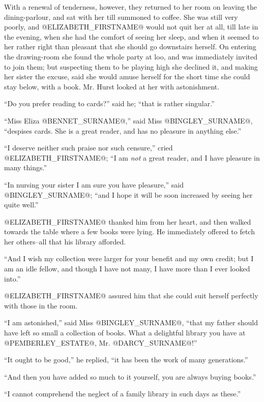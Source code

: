 With a renewal of tenderness, however, they returned to her room on
leaving the dining-parlour, and sat with her till summoned to coffee.
She was still very poorly, and @ELIZABETH_FIRSTNAME@ would not quit her at all, till
late in the evening, when she had the comfort of seeing her sleep, and
when it seemed to her rather right than pleasant that she should go
downstairs herself. On entering the drawing-room she found the whole
party at loo, and was immediately invited to join them; but suspecting
them to be playing high she declined it, and making her sister the
excuse, said she would amuse herself for the short time she could stay
below, with a book. Mr. Hurst looked at her with astonishment.

``Do you prefer reading to cards?'' said he; ``that is rather singular.''

``Miss Eliza @BENNET_SURNAME@,'' said Miss @BINGLEY_SURNAME@, ``despises cards. She is a great
reader, and has no pleasure in anything else.''

``I deserve neither such praise nor such censure,'' cried @ELIZABETH_FIRSTNAME@; ``I am
\textit{not} a great reader, and I have pleasure in many things.''

``In nursing your sister I am sure you have pleasure,'' said @BINGLEY_SURNAME@; ``and
I hope it will be soon increased by seeing her quite well.''

@ELIZABETH_FIRSTNAME@ thanked him from her heart, and then walked towards the
table where a few books were lying. He immediately offered to fetch her
others--all that his library afforded.

``And I wish my collection were larger for your benefit and my own
credit; but I am an idle fellow, and though I have not many, I have more
than I ever looked into.''

@ELIZABETH_FIRSTNAME@ assured him that she could suit herself perfectly with those
in the room.

``I am astonished,'' said Miss @BINGLEY_SURNAME@, ``that my father should have left
so small a collection of books. What a delightful library you have at
@PEMBERLEY_ESTATE@, Mr. @DARCY_SURNAME@!''

``It ought to be good,'' he replied, ``it has been the work of many
generations.''

``And then you have added so much to it yourself, you are always buying
books.''

``I cannot comprehend the neglect of a family library in such days as
these.''


